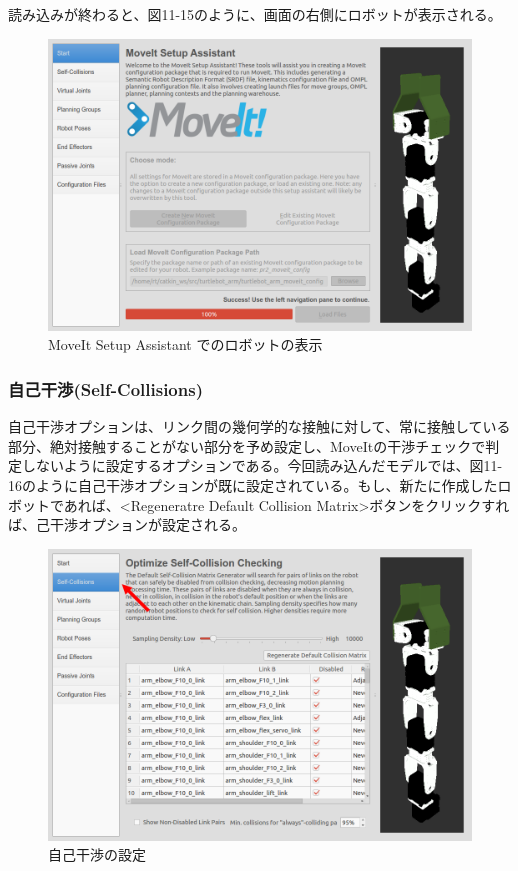 読み込みが終わると、図11-15のように、画面の右側にロボットが表示される。\\

\begin{figure}[htp]
  \centering
  \includegraphics[width=12cm]{pictures/chapter11/pic_11_15.png}
  \caption{MoveIt Setup Assistant でのロボットの表示}
\end{figure}

\subsubsection{自己干渉(Self-Collisions)}

自己干渉オプションは、リンク間の幾何学的な接触に対して、常に接触している部分、絶対接触することがない部分を予め設定し、MoveItの干渉チェックで判定しないように設定するオプションである。今回読み込んだモデルでは、図11-16のように自己干渉オプションが既に設定されている。もし、新たに作成したロボットであれば、<Regeneratre Default Collision Matrix>ボタンをクリックすれば、己干渉オプションが設定される。

\begin{figure}[htp]
  \centering
  \includegraphics[width=12cm]{pictures/chapter11/pic_11_16.png}
  \caption{自己干渉の設定}
\end{figure}


